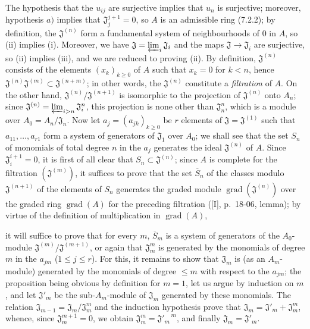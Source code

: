The hypothesis that the $u_{ij}$ are surjective implies that $u_n$ is surjective;
moreover, hypothesis $a)$ implies that $\mathfrak J_j^{j+1}=0$, so $A$ is
an admissible ring (7.2.2); by definition, the $\mathfrak J^{(n)}$ form
a fundamental system of neighbourhoods of $0$ in $A$, so (ii) implies (i).
Moreover, we have $\mathfrak J=\varprojlim_i\mathfrak J_i$ and the maps
$\mathfrak J\to\mathfrak J_i$ are surjective, so (ii) implies (iii), and
we are reduced to proving (ii). By definition, $\mathfrak J^{(n)}$ consists
of the elements $(x_k)_{k\geq0}$ of $A$ such that $x_k=0$ for $k<n$, hence
$\mathfrak J^{(n)}\mathfrak J^{(m)}\subset\mathfrak J^{(n+m)}$; in other words,
the $\mathfrak J^{(n)}$ constitute a \emph{filtration} of $A$. On the other
hand, $\mathfrak J^{(n)}/\mathfrak J^{(n+1)}$ is isomorphic to the projection of
$\mathfrak J^{(n)}$ onto $A_n$; since
$\mathfrak J^{(n)}=\varprojlim_{i>n}\mathfrak J_i^n$, this projection is none
other than $\mathfrak J_n^n$, which is a module over
$A_0=A_n/\mathfrak J_n$. Now let $a_j=(a_{jk})_{k\geq0}$ be $r$ elements of
$\mathfrak J=\mathfrak J^{(1)}$ such that $a_{11},\ldots,a_{r1}$ form a
system of generators of $\mathfrak J_1$ over $A_0$; we shall see that
the set $S_n$ of monomials of total degree $n$ in the $a_j$ generates the ideal
$\mathfrak J^{(n)}$ of $A$. Since $\mathfrak J_i^{i+1}=0$, it is first of all
clear that $S_n\subset\mathfrak J^{(n)}$; since $A$ is complete for the
filtration $(\mathfrak J^{(m)})$, it suffices to prove that the set
$\overline S_n$ of the classes modulo $\mathfrak J^{(n+1)}$ of the elements of $S_n$
generates the graded module $\operatorname{grad}(\mathfrak J^{(n)})$ over
the graded ring $\operatorname{grad}(A)$ for the preceding filtration
([I], p.~18-06, lemma); by virtue of the definition of multiplication in
$\operatorname{grad}(A)$,


it will suffice to prove that for every $m$, $\overline S_m$ is a system of
generators of the $A_0$-module
$\mathfrak J^{(m)}/\mathfrak J^{(m+1)}$, or again that $\mathfrak J_m^m$ is
generated by the monomials of degree $m$ in the $a_{jm}$ ($1\leq j\leq r$).
For this, it remains to show that $\mathfrak J_m$ is (as an
$A_m$-module) generated by the monomials of degree $\leq m$ with respect to the
$a_{jm}$; the proposition being obvious by definition for $m=1$,
let us argue by induction on $m$, and let $\mathfrak J'_m$ be the sub-$A_m$-module
of $\mathfrak J_m$ generated by these monomials. The relation
$\mathfrak J_{m-1}=\mathfrak J_m/\mathfrak J_m^m$ and the induction hypothesis
prove that $\mathfrak J_m=\mathfrak J'_m+\mathfrak J_m^m$, whence, since
$\mathfrak J_m^{m+1}=0$, we obtain
$\mathfrak J_m^m={\mathfrak J'_m}^{\,m}$, and finally
$\mathfrak J_m=\mathfrak J'_m$.

